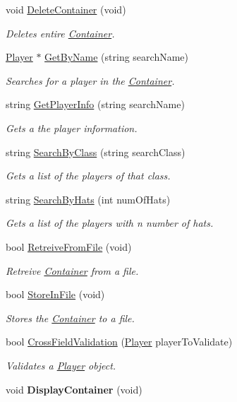 \begin{DoxyCompactItemize}
void \hyperlink{class_container_ae840ec5b490033434a9af64722286e1b}{Delete\+Container} (void)
\begin{DoxyCompactList}\small\item\em Deletes entire \hyperlink{class_container}{Container}. \end{DoxyCompactList}\item 
\hyperlink{class_player}{Player} $\ast$ \hyperlink{class_container_a08fc1eb5b5871afe1bc0f821c935ee5c}{Get\+By\+Name} (string search\+Name)
\begin{DoxyCompactList}\small\item\em Searches for a player in the \hyperlink{class_container}{Container}. \end{DoxyCompactList}\item 
string \hyperlink{class_container_a5beb2ec33f09af68001cdef6de321759}{Get\+Player\+Info} (string search\+Name)
\begin{DoxyCompactList}\small\item\em Gets a the player information. \end{DoxyCompactList}\item 
string \hyperlink{class_container_a75f0e33e9004113fe8630022b378358c}{Search\+By\+Class} (string search\+Class)
\begin{DoxyCompactList}\small\item\em Gets a list of the players of that class. \end{DoxyCompactList}\item 
string \hyperlink{class_container_ac67fdca3ba82e56a1795f748aa2a4e89}{Search\+By\+Hats} (int num\+Of\+Hats)
\begin{DoxyCompactList}\small\item\em Gets a list of the players with n number of hats. \end{DoxyCompactList}\item 
bool \hyperlink{class_container_a5a41ee2f12b10f834bcf3814dfcb7e77}{Retreive\+From\+File} (void)
\begin{DoxyCompactList}\small\item\em Retreive \hyperlink{class_container}{Container} from a file. \end{DoxyCompactList}\item 
bool \hyperlink{class_container_a3fbf493b69d0fdb0428ba9fd4384a1ae}{Store\+In\+File} (void)
\begin{DoxyCompactList}\small\item\em Stores the \hyperlink{class_container}{Container} to a file. \end{DoxyCompactList}\item 
bool \hyperlink{class_container_a10e9ba7886699c51a9de5f7c48ba81a8}{Cross\+Field\+Validation} (\hyperlink{class_player}{Player} player\+To\+Validate)
\begin{DoxyCompactList}\small\item\em Validates a \hyperlink{class_player}{Player} object. \end{DoxyCompactList}\item 
\hypertarget{class_container_aa7aba0b9646397931010aee0da898dda}{}void {\bfseries Display\+Container} (void)\label{class_container_aa7aba0b9646397931010aee0da898dda}


\end{DoxyCompactItemize}
